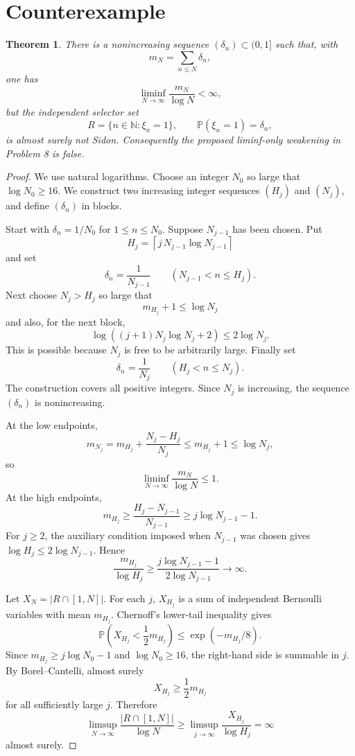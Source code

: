 \documentclass[11pt]{article}
\newtheorem{theorem}{Theorem}
\newcommand{\N}{\mathbb N}
\newcommand{\Pp}{\mathbb P}
\begin{document}
\section*{Counterexample}

\begin{theorem}
There is a nonincreasing sequence \((\delta_n)\subset(0,1]\) such that, with
\[
  m_N=\sum_{n\leq N}\delta_n,
\]
one has
\[
  \liminf_{N\to\infty}\frac{m_N}{\log N}<\infty,
\]
but the independent selector set
\[
  R=\{n\in\N:\xi_n=1\},\qquad \Pp(\xi_n=1)=\delta_n,
\]
is almost surely not Sidon. Consequently the proposed liminf-only weakening
in Problem 8 is false.
\end{theorem}

\begin{proof}
We use natural logarithms. Choose an integer \(N_0\) so large that
\(\log N_0\geq 16\). We construct two increasing integer sequences
\((H_j)\) and \((N_j)\), and define \((\delta_n)\) in blocks.

Start with \(\delta_n=1/N_0\) for \(1\leq n\leq N_0\). Suppose \(N_{j-1}\)
has been chosen. Put
\[
  H_j=\left\lceil j\,N_{j-1}\log N_{j-1}\right\rceil
\]
and set
\[
  \delta_n=\frac1{N_{j-1}}\qquad (N_{j-1}<n\leq H_j).
\]
Next choose \(N_j>H_j\) so large that
\[
  m_{H_j}+1\leq \log N_j
\]
and also, for the next block,
\[
  \log\!\left((j+1)N_j\log N_j+2\right)\leq 2\log N_j .
\]
This is possible because \(N_j\) is free to be arbitrarily large. Finally set
\[
  \delta_n=\frac1{N_j}\qquad (H_j<n\leq N_j).
\]
The construction covers all positive integers. Since \(N_j\) is increasing,
the sequence \((\delta_n)\) is nonincreasing.

At the low endpoints,
\[
  m_{N_j}=m_{H_j}+\frac{N_j-H_j}{N_j}\leq m_{H_j}+1\leq \log N_j,
\]
so
\[
  \liminf_{N\to\infty}\frac{m_N}{\log N}\leq 1 .
\]
At the high endpoints,
\[
  m_{H_j}
  \geq \frac{H_j-N_{j-1}}{N_{j-1}}
  \geq j\log N_{j-1}-1 .
\]
For \(j\geq 2\), the auxiliary condition imposed when \(N_{j-1}\) was chosen
gives \(\log H_j\leq 2\log N_{j-1}\). Hence
\[
  \frac{m_{H_j}}{\log H_j}
  \geq
  \frac{j\log N_{j-1}-1}{2\log N_{j-1}}
  \longrightarrow \infty .
\]

Let \(X_N=|R\cap[1,N]|\). For each \(j\), \(X_{H_j}\) is a sum of independent
Bernoulli variables with mean \(m_{H_j}\). Chernoff's lower-tail inequality
gives
\[
  \Pp\left(X_{H_j}<\frac12 m_{H_j}\right)\leq \exp(-m_{H_j}/8).
\]
Since \(m_{H_j}\geq j\log N_0-1\) and \(\log N_0\geq 16\), the right-hand
side is summable in \(j\). By Borel--Cantelli, almost surely
\[
  X_{H_j}\geq \frac12 m_{H_j}
\]
for all sufficiently large \(j\). Therefore
\[
  \limsup_{N\to\infty}\frac{|R\cap[1,N]|}{\log N}
  \geq
  \limsup_{j\to\infty}\frac{X_{H_j}}{\log H_j}
  =\infty
\]
almost surely.


\end{proof}
\end{document}
